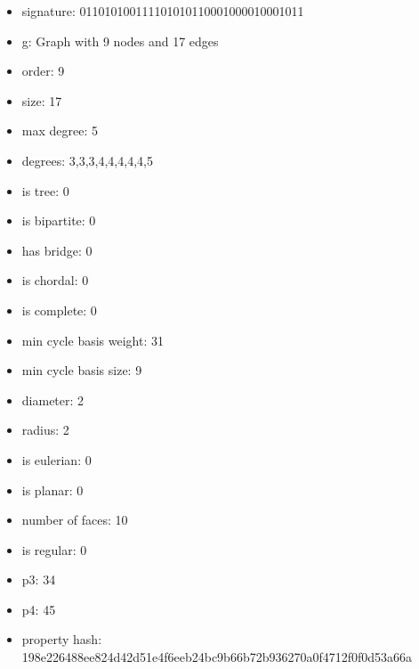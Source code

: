 \newpage
\begin{figure}
\end{figure}
\begin{itemize}
\item signature: 011010100111101010110001000010001011
\item g: Graph with 9 nodes and 17 edges
\item order: 9
\item size: 17
\item max degree: 5
\item degrees: 3,3,3,4,4,4,4,4,5
\item is tree: 0
\item is bipartite: 0
\item has bridge: 0
\item is chordal: 0
\item is complete: 0
\item min cycle basis weight: 31
\item min cycle basis size: 9
\item diameter: 2
\item radius: 2
\item is eulerian: 0
\item is planar: 0
\item number of faces: 10
\item is regular: 0
\item p3: 34
\item p4: 45
\item property hash: 198e226488ee824d42d51e4f6eeb24bc9b66b72b936270a0f4712f0f0d53a66a
\end{itemize}
